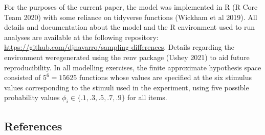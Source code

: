 \documentclass[
  english,
  doc]{apa6}
\begin{document}
\noindent
For the purposes of the current paper, the model was implemented in R (R Core Team 2020) with some reliance on tidyverse functions (Wickham et al 2019). All details and documentation about the model and the R environment used to run analyses are available at the following repository: \url{https://github.com/djnavarro/sampling-differences}. Details regarding the environment weregenerated using the renv package (Ushey 2021) to aid future reproducibility. In all modelling exercises, the finite approximate hypothesis space consisted of \(5^6 = 15625\) functions whose values are specified at the six stimulus values corresponding to the stimuli used in the experiment, using five possible probability values \(\phi_i \in \{.1, .3, .5, .7, .9\}\) for all items.

\hypertarget{references}{%
\subsection{References}\label{references}}
\end{document}
